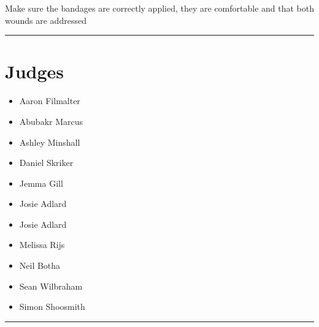 \documentclass[10pt]{article}
\begin{document}
Make sure the bandages are correctly applied, they are comfortable and that both wounds are addressed
\vspace{0.5cm}
	\hrule
	\vspace{0.5cm}
		\section*{\faUsers \: Judges}

		

	\begin{multicols}{2}

		\begin{itemize}
									\item Aaron Filmalter
									\item Abubakr Marcus
									\item Ashley Minshall
									\item Daniel Skriker
									\item Jemma Gill
									\item Josie Adlard
						\end{itemize}

		\vfill\null
		\columnbreak

		\begin{itemize}
									\item Josie Adlard
									\item Melissa Rijs
									\item Neil Botha
									\item Sean Wilbraham
									\item Simon Shoosmith
						\end{itemize}

		\vfill\null

		\end{multicols}



			\vspace{0.5cm}
	\hrule
	\vspace{0.5cm}
\end{document}
